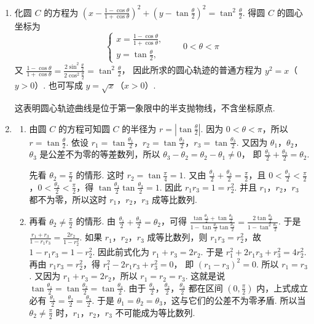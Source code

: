 \documentclass[UTF8,a4paper,oneside,11pt]{ctexbook}
\begin{document}
\begin{solution}
\begin{enumerate}
\item 化圆 \(C\) 的方程为 \(\left( x-\frac{1-\cos \theta}{1+\cos \theta} \right)^2+\left( y-\tan \frac{\theta}{2} \right)^2=\tan^2 \frac{\theta}{2}\).
得圆 \(C\) 的圆心坐标为
\[
\begin{cases}
x=\frac{1-\cos \theta}{1+\cos \theta},\\
y=\tan \frac{\theta}{2},
\end{cases}
\qquad 0<\theta<\pi
\]
又
\(\frac{1-\cos \theta}{1+\cos \theta}=\frac{2\sin^2 \frac{\theta}{2}}{2\cos^2 \frac{\theta}{2}}=\tan^2 \frac{\theta}{2}\)，
因此所求的圆心轨迹的普通方程为
\(y^2=x\)（\(y>0\)）.
也可写成 \(y=\sqrt{x}\)（\(x>0\)）.


这表明圆心轨迹曲线是位于第一象限中的半支抛物线，不含坐标原点.

\item
\begin{enumerate}
\item 由圆 \(C\) 的方程可知圆 \(C\) 的半径为
\(r=\left| \tan \frac{\theta}{2} \right|\).
因为 \(0<\theta<\pi\)，所以 \(r=\tan \frac{\theta}{2}\). 依设
\(r_1=\tan \frac{\theta_1}{2}\)，\(r_2=\tan \frac{\theta_2}{2}\)，\(r_3=\tan \frac{\theta_3}{2}\).
又因为 \(\theta_1\)，\(\theta_2\)，\(\theta_3\) 是公差不为零的等差数列，所以
\(\theta_3-\theta_2=\theta_2-\theta_1\neq 0\)，
即
\(\frac{\theta_1}{2}+\frac{\theta_3}{2}=\theta_2\).

先看 \(\theta_2=\frac{\pi}{2}\) 的情形. 这时
\(r_2=\tan \frac{\pi}{4}=1\).
又由 \(\frac{\theta_1}{2}+\frac{\theta_3}{2}=\frac{\pi}{2}\)，且 \(0<\frac{\theta_1}{2}<\frac{\pi}{2}\)，\(0<\frac{\theta_2}{2}<\frac{\pi}{2}\)，得
\(\tan \frac{\theta_1}{2}\tan \frac{\theta_3}{2}=1\).
因此
\(r_1r_3=1=r_2^2\).
并且 \(r_1\)，\(r_2\)，\(r_3\) 都不为零，所以这时 \(r_1\)，\(r_2\)，\(r_3\) 成等比数列.

\item 再看 \(\theta_2\neq \frac{\pi}{2}\) 的情形. 由 \(\frac{\theta_1}{2}+\frac{\theta_3}{2}=\theta_2\)，可得
\(\frac{\tan \frac{\theta_1}{2}+\tan \frac{\theta_3}{2}}{1-\tan \frac{\theta_1}{2}\tan \frac{\theta_3}{2}}=\frac{2\tan \frac{\theta_2}{2}}{1-\tan^2 \frac{\theta_2}{2}}\).
于是
\(\frac{r_1+r_3}{1-r_1r_3}=\frac{2r_2}{1-r_2^2}\).
如果 \(r_1\)，\(r_2\)，\(r_3\) 成等比数列，则 \(r_1r_3=r_2^2\)，故 \(1-r_1r_3=1-r_2^2\). 因此前式化为
\(r_1+r_3=2r_2\).
于是
\(r_1^2+2r_1r_3+r_3^2=4r_2^2\).
再由 \(r_1r_3=r_2^2\)，得
\(r_1^2-2r_1r_3+r_3^2=0\)，
即
\(\left( r_1-r_3 \right)^2=0\).
所以 \(r_1=r_3\). 又因为 \(r_1+r_3=2r_2\)，所以 \(r_1=r_2=r_3\). 这就是说
\(\tan \frac{\theta_1}{2}=\tan \frac{\theta_2}{2}=\tan \frac{\theta_3}{2}\).
由于 \(\frac{\theta_1}{2}\)，\(\frac{\theta_2}{2}\)，\(\frac{\theta_3}{2}\) 都在区间 \(\left( 0,\frac{\pi}{2} \right)\) 内，上式成立必有
\(\frac{\theta_1}{2}=\frac{\theta_2}{2}=\frac{\theta_3}{2}\).
于是 \(\theta_1=\theta_2=\theta_3\)，这与它们的公差不为零矛盾. 所以当 \(\theta_2\neq \frac{\pi}{2}\) 时，\(r_1\)，\(r_2\)，\(r_3\) 不可能成为等比数列.


\end{enumerate}
\end{enumerate}
\end{solution}
\end{document}
